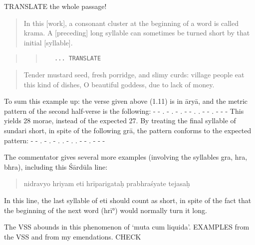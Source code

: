 \documentclass[]{article}
\begin{document}
TRANSLATE the whole passage!

\begin{quote}
In this {[}work{]}, a consonant cluster at the beginning of a word is
called krama. A {[}preceding{]} long syllable can sometimes be turned
short by that initial {[}syllable{]}.
\end{quote}

\begin{quote}
\begin{quote}
\begin{verbatim}
   ... TRANSLATE 
\end{verbatim}
\end{quote}
\end{quote}

\begin{quote}
Tender mustard seed, fresh porridge, and slimy curds: village people eat
this kind of dishes, O beautiful goddess, due to lack of money.
\end{quote}

To sum this example up: the verse given above (1.11) is in āryā, and the
metric pattern of the second half-verse is the following: - - . - . - .
- - . . - - . - - - This yields 28 morae, instead of the expected 27. By
treating the final syllable of sundari short, in spite of the following
grā, the pattern conforms to the expected pattern: - - . - . - . . - . .
- - . - - -

The commentator gives several more examples (involving the syllables
gra, hra, bhra), including this Śārdūla line:

\begin{quote}
nidravyo hriyam eti hrīparigataḥ prabhraśyate tejasaḥ
\end{quote}

In this line, the last syllable of eti should count as short, in spite
of the fact that the beginning of the next word (hrī°) would normally
turn it long.

The VSS abounds in this phenomenon of `muta cum liquida'. EXAMPLES from
the VSS and from my emendations. CHECK
\end{document}
